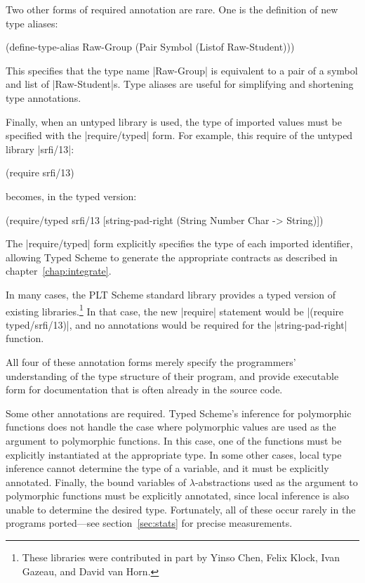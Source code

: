 \begin{schemeregion}
Two other forms of required annotation are rare.  One is the definition of
new type aliases:

\begin{schemedisplay}
(define-type-alias Raw-Group (Pair Symbol (Listof Raw-Student)))
\end{schemedisplay}
\noindent
This specifies that the type name \scheme|Raw-Group| is equivalent to
a pair of a symbol and list of \scheme|Raw-Student|s.  Type aliases
are useful for simplifying and shortening type annotations.

Finally, when an untyped library is used, the type of imported values
must be specified with the \scheme|require/typed| form.  
For example, this require of the untyped library \scheme|srfi/13|:
\begin{schemedisplay}
(require srfi/13)
\end{schemedisplay}
becomes, in the typed version:
\begin{schemedisplay}
(require/typed srfi/13 
  [string-pad-right (String Number Char -> String)])
\end{schemedisplay}
\noindent
The \scheme|require/typed| form explicitly specifies the type of each
imported identifier, allowing Typed Scheme to generate the appropriate
contracts as described in chapter~\ref{chap:integrate}.

In many cases, the PLT Scheme standard library provides a typed
version of existing libraries.\footnote{These libraries were contributed in part
  by Yinso Chen, Felix Klock, Ivan Gazeau, and David van Horn.}
  In that case, the new \scheme|require|
statement would be
\scheme|(require typed/srfi/13)|, and no annotations would be required
for the \scheme|string-pad-right| function.


All four of these annotation forms merely specify the programmers'
 understanding of the type structure of their program, and
provide executable form for documentation that is often already in the
source code.  

Some other annotations are required.  Typed Scheme's inference for
polymorphic functions does not handle the case where polymorphic
values are used as the argument to polymorphic functions.  In this
case, one of the functions must be explicitly instantiated at the
appropriate type.  In some other cases, local type inference cannot
determine the type of a variable, and it must be explicitly
annotated.  Finally, the bound variables of $\lambda$-abstractions used as
the argument to polymorphic functions must be explicitly annotated,
since local inference is also unable to determine the desired type.
Fortunately, all of these occur rarely in the programs ported---see
section~\ref{sec:stats} for precise measurements.


\end{schemeregion}
